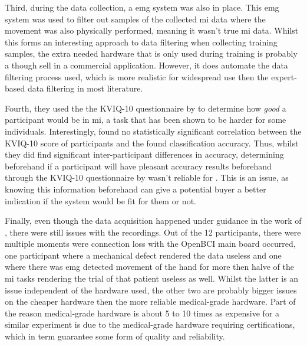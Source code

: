 Third, during the data collection, a \gls{emg} system was also in place.
This \gls{emg} system was used to filter out samples of the collected \gls{mi} data where the movement was also physically performed, meaning it wasn't true \gls{mi} data.
Whilst this forms an interesting approach to data filtering when collecting training samples, the extra needed hardware that is only used during training is probably a though sell in a commercial application.
However, it does automate the data filtering process used, which is more realistic for widespread use then the expert-based data filtering in most literature. 

Fourth, they used the the KVIQ-10 questionnaire by \citet{kviq} to determine how \textit{good} a participant would be in \gls{mi}, a task that has been shown to be harder for some individuals.
Interestingly, \citet{cheap_bci_feasibility} found no statistically significant correlation between the KVIQ-10 score of participants and the found classification accuracy.
Thus, whilst they did find significant inter-participant differences in accuracy, determining beforehand if a participant will have pleasant accuracy results beforehand through the KVIQ-10 questionnaire by \citet{kviq} wasn't reliable for \citet{cheap_bci_feasibility}.
This is an issue, as knowing this information beforehand can give a potential buyer a better indication if the system would be fit for them or not.

Finally, even though the data acquisition happened under guidance in the work of \citet{cheap_bci_feasibility}, there were still issues with the recordings.
Out of the 12 participants, there were multiple moments were connection loss with the OpenBCI main board occurred, one participant where a mechanical defect rendered the data useless and one where there was \gls{emg} detected movement of the hand for more then halve of the \gls{mi} tasks rendering the trial of that patient useless as well.
Whilst the latter is an issue independent of the hardware used, the other two are probably bigger issues on the cheaper hardware then the more reliable medical-grade hardware.
Part of the reason medical-grade hardware is about 5 to 10 times as expensive for a similar experiment is due to the medical-grade hardware requiring certifications, which in term guarantee some form of quality and reliability. 

